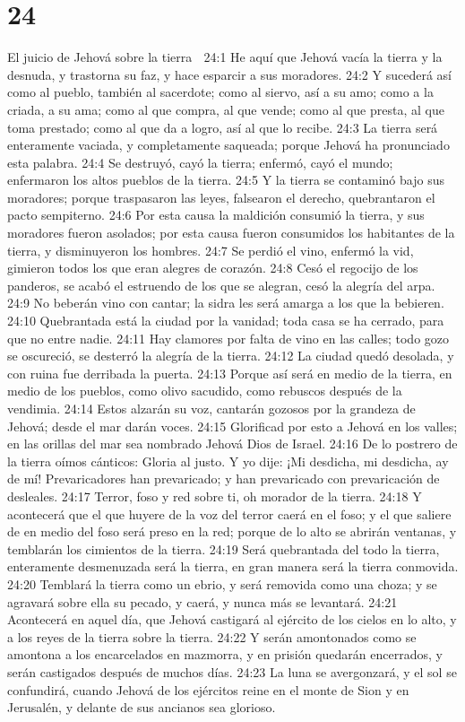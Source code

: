 \chapter{24}

El juicio de Jehová sobre la tierra  

24:1 He aquí que Jehová vacía la tierra y la desnuda, y trastorna su faz, y hace esparcir a sus moradores.  
24:2 Y sucederá así como al pueblo, también al sacerdote; como al siervo, así a su amo; como a la criada, a su ama; como al que compra, al que vende; como al que presta, al que toma prestado; como al que da a logro, así al que lo recibe.  
24:3 La tierra será enteramente vaciada, y completamente saqueada; porque Jehová ha pronunciado esta palabra.  
24:4 Se destruyó, cayó la tierra; enfermó, cayó el mundo; enfermaron los altos pueblos de la tierra.  
24:5 Y la tierra se contaminó bajo sus moradores; porque traspasaron las leyes, falsearon el derecho, quebrantaron el pacto sempiterno.  
24:6 Por esta causa la maldición consumió la tierra, y sus moradores fueron asolados; por esta causa fueron consumidos los habitantes de la tierra, y disminuyeron los hombres.  
24:7 Se perdió el vino, enfermó la vid, gimieron todos los que eran alegres de corazón.  
24:8 Cesó el regocijo de los panderos, se acabó el estruendo de los que se alegran, cesó la alegría del arpa.  
24:9 No beberán vino con cantar; la sidra les será amarga a los que la bebieren.  
24:10 Quebrantada está la ciudad por la vanidad; toda casa se ha cerrado, para que no entre nadie.  
24:11 Hay clamores por falta de vino en las calles; todo gozo se oscureció, se desterró la alegría de la tierra.  
24:12 La ciudad quedó desolada, y con ruina fue derribada la puerta.  
24:13 Porque así será en medio de la tierra, en medio de los pueblos, como olivo sacudido, como rebuscos después de la vendimia.  
24:14 Estos alzarán su voz, cantarán gozosos por la grandeza de Jehová; desde el mar darán voces.  
24:15 Glorificad por esto a Jehová en los valles; en las orillas del mar sea nombrado Jehová Dios de Israel.  
24:16 De lo postrero de la tierra oímos cánticos: Gloria al justo. Y yo dije: ¡Mi desdicha, mi desdicha, ay de mí! Prevaricadores han prevaricado; y han prevaricado con prevaricación de desleales.  
24:17 Terror, foso y red sobre ti, oh morador de la tierra.  
24:18 Y acontecerá que el que huyere de la voz del terror caerá en el foso; y el que saliere de en medio del foso será preso en la red; porque de lo alto se abrirán ventanas, y temblarán los cimientos de la tierra.  
24:19 Será quebrantada del todo la tierra, enteramente desmenuzada será la tierra, en gran manera será la tierra conmovida.  
24:20 Temblará la tierra como un ebrio, y será removida como una choza; y se agravará sobre ella su pecado, y caerá, y nunca más se levantará.  
24:21 Acontecerá en aquel día, que Jehová castigará al ejército de los cielos en lo alto, y a los reyes de la tierra sobre la tierra.  
24:22 Y serán amontonados como se amontona a los encarcelados en mazmorra, y en prisión quedarán encerrados, y serán castigados después de muchos días.  
24:23 La luna se avergonzará, y el sol se confundirá, cuando Jehová de los ejércitos reine en el monte de Sion y en Jerusalén, y delante de sus ancianos sea glorioso.  


